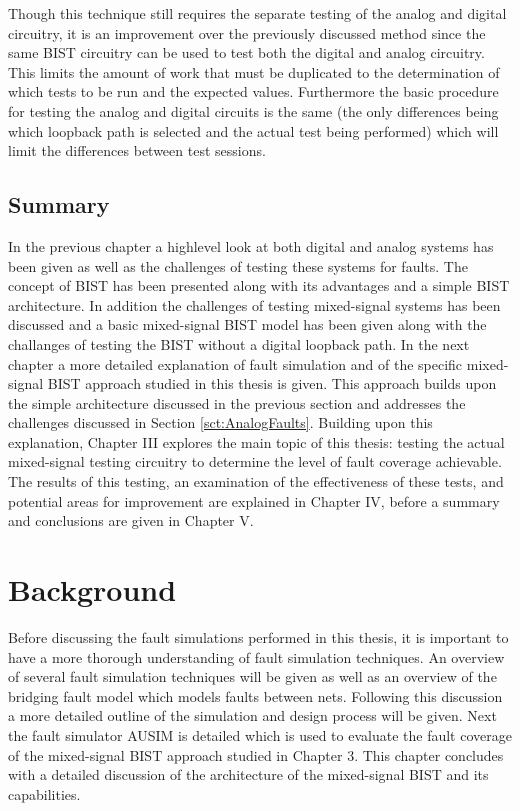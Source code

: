 \documentclass[12pt]{report}
\begin{document}
Though this technique still requires the separate testing of the analog and digital circuitry, it is an improvement over the previously discussed method since the same BIST circuitry can be used to test both the digital and analog circuitry\cite{stroud}.  This limits the amount of work that must be duplicated to the determination of which tests to be run and the expected values.  Furthermore the basic procedure for testing the analog and digital circuits is the same (the only differences being which loopback path is selected and the actual test being performed) which will limit the differences between test sessions.

\section{Summary}
In the previous chapter a highlevel look at both digital and analog systems has been given as well as the challenges of testing these systems for faults.  The concept of BIST has been presented along with its advantages and a simple BIST architecture.  In addition the challenges of testing mixed-signal systems has been discussed and a basic mixed-signal BIST model has been given along with the challanges of testing the BIST without a digital loopback path.  In the next chapter a more detailed explanation of fault simulation and of the specific mixed-signal BIST approach studied in this thesis is given.  This approach builds upon the simple architecture discussed in the previous section and addresses the challenges discussed in Section \ref{sct:AnalogFaults}.  Building upon this explanation, Chapter III explores the main topic of this thesis: testing the actual mixed-signal testing circuitry to determine the level of fault coverage achievable.  The results of this testing, an examination of the effectiveness of these tests, and potential areas for improvement are explained in Chapter IV, before a summary and conclusions are given in Chapter V.

\chapter{Background}
Before discussing the fault simulations performed in this thesis, it is important to have a more thorough understanding of fault simulation techniques.  An overview of several fault simulation techniques will be given as well as an overview of the bridging fault model which models faults between nets.  Following this discussion a more detailed outline of the simulation and design process will be given.  Next the fault simulator AUSIM is detailed which is used to evaluate the fault coverage of the mixed-signal BIST approach studied in Chapter 3.  This chapter concludes with a detailed discussion of the architecture of the mixed-signal BIST and its capabilities.
\end{document}
